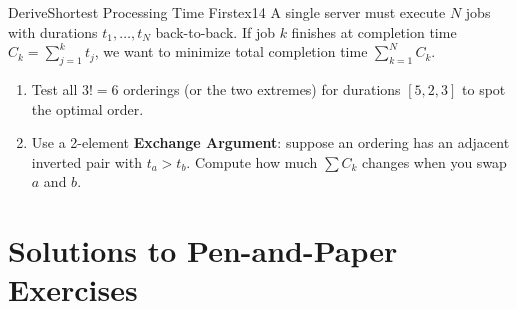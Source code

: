 \documentclass[11pt,a4paper]{article}
\theoremstyle{definition}
\begin{document}
\begin{tryitbox}{Derive}{Shortest Processing Time First}{ex14}
A single server must execute $N$ jobs with durations $t_1, \dots, t_N$ back-to-back. If job $k$ finishes at completion time $C_k = \sum_{j=1}^{k} t_j$, we want to minimize total completion time $\sum_{k=1}^{N} C_k$.
\begin{enumerate}[itemsep=1pt, topsep=2pt]
    \item Test all $3! = 6$ orderings (or the two extremes) for durations $[5, 2, 3]$ to spot the optimal order.
    \item Use a 2-element \textbf{Exchange Argument}: suppose an ordering has an adjacent inverted pair with $t_a > t_b$. Compute how much $\sum C_k$ changes when you swap $a$ and $b$.
\end{enumerate}
\end{tryitbox}

\section*{Solutions to Pen-and-Paper Exercises}
\end{document}
